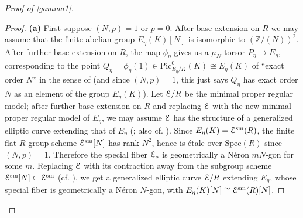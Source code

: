 \documentclass[11pt]{amsart}
\theoremstyle{definition}
\begin{document}
\begin{proof}[Proof of \ref{gamma1}]
\begin{proof}
\textbf{(a)} First suppose $(N,p) = 1$ or $p=0$. After base extension on $R$ we may assume that the finite abelian group $E_\eta(K) [N]$ is isomorphic to $(\mathbb{Z}/(N))^2$. After further base extension on $R$, the map $\phi_\eta$ gives us a $\mu_N$-torsor $P_\eta \rightarrow E_\eta$, corresponding to the point $Q_\eta = \phi_\eta(1) \in \mathrm{Pic}^0_{E_\eta/K}(K) \cong E_\eta(K)$ of ``exact order $N$'' in the sense of \cite[\S1.4]{KM1} (and since $(N,p) = 1$, this just says $Q_\eta$ has exact order $N$ as an element of the group $E_\eta(K)$). Let ${\mathbf{\EuScript{E}}}/R$ be the minimal proper regular model; after further base extension on $R$ and replacing ${\mathbf{\EuScript{E}}}$ with the new minimal proper regular model of $E_\eta$, we may assume ${\mathbf{\EuScript{E}}}$ has the structure of a generalized elliptic curve extending that of $E_\eta$ (\cite[IV.1.6]{DR}; also cf. \cite[proof of 3.2.6]{C}). Since $E_\eta(K) = {\mathbf{\EuScript{E}}}^{\mathrm{sm}}(R)$, the finite flat $R$-group scheme ${\mathbf{\EuScript{E}}}^{\mathrm{sm}}[N]$ has rank $N^2$, hence is \'etale over $\mathrm{Spec}(R)$ since $(N,p) = 1$. Therefore the special fiber ${\mathbf{\EuScript{E}}}_s$ is geometrically a N\'eron $mN$-gon for some $m$. Replacing ${\mathbf{\EuScript{E}}}$ with its contraction away from the subgroup scheme ${\mathbf{\EuScript{E}}}^{\mathrm{sm}}[N] \subset {\mathbf{\EuScript{E}}}^{\mathrm{sm}}$ (cf. \cite[IV.1]{DR}), we get a generalized elliptic curve ${\mathbf{\EuScript{E}}}/R$ extending $E_\eta$, whose special fiber is geometrically a N\'eron $N$-gon, with $E_\eta(K)[N] \cong {\mathbf{\EuScript{E}}}^{\mathrm{sm}}(R) [N]$. 


\end{proof}
\end{proof}
\end{document}
